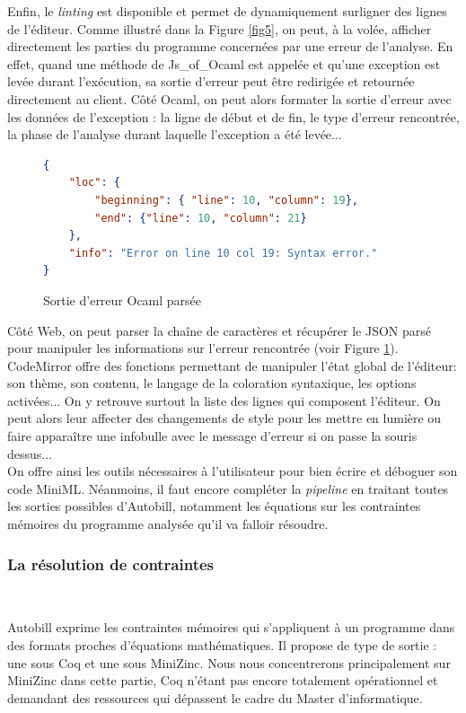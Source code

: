 \documentclass[12pt]{article}
\begin{document}
Enfin, le \textit{linting} est disponible et permet de dynamiquement surligner des lignes de l'éditeur. Comme illustré dans la Figure \ref{fig5}, on peut, à la volée, afficher directement les parties du programme concernées par une erreur de l'analyse. En effet, quand une méthode de Js\_of\_Ocaml est appelée et qu'une exception est levée durant l'exécution, sa sortie d'erreur peut être redirigée et retournée directement au client. Côté Ocaml, on peut alors formater la sortie d'erreur avec les données de l'exception : la ligne de début et de fin, le type d'erreur rencontrée, la phase de l'analyse durant laquelle l'exception a été levée... \\
\begin{figure}
      \centering
      \begin{lstlisting}[language=json,firstnumber=1]
{
    "loc": {
        "beginning": { "line": 10, "column": 19},
        "end": {"line": 10, "column": 21}
    },
    "info": "Error on line 10 col 19: Syntax error."
}
\end{lstlisting}
      \caption{Sortie d'erreur Ocaml parsée\label{fig6}}
\end{figure}

Côté Web, on peut parser la chaîne de caractères et récupérer le JSON parsé pour manipuler les informations sur l'erreur rencontrée (voir Figure \ref{fig6}). CodeMirror offre des fonctions permettant de manipuler l'état global de l'éditeur: son thème, son contenu, le langage de la coloration syntaxique, les options activées... On y retrouve surtout la liste des lignes qui composent l'éditeur. On peut alors leur affecter des changements de style pour les mettre en lumière ou faire apparaître une infobulle avec le message d'erreur si on passe la souris dessus... \\

On offre ainsi les outils nécessaires à l'utilisateur pour bien écrire et déboguer son code MiniML. Néanmoins, il faut encore compléter la \textit{pipeline} en traitant toutes les sorties possibles d'Autobill, notamment les équations sur les contraintes mémoires du programme analysée qu'il va falloir résoudre.

\subsubsection{La résolution de contraintes}\

Autobill exprime les contraintes mémoires qui s'appliquent à un programme dans des formats proches d'équations mathématiques. Il propose de type de sortie : une sous Coq et une sous MiniZinc. Nous nous concentrerons principalement sur MiniZinc dans cette partie, Coq n'étant pas encore totalement opérationnel et demandant des ressources qui dépassent le cadre du Master d'informatique. \\
\end{document}
